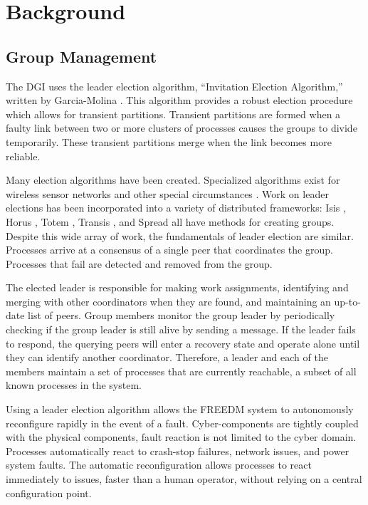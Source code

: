 \section{Background}

\subsection{Group Management}

The DGI uses the leader election algorithm, ``Invitation Election Algorithm,'' written by Garcia-Molina \cite{INVITATIONELECTION}.
This algorithm provides a robust election procedure which allows for transient partitions.
Transient partitions are formed when a faulty link between two or more clusters of processes causes the groups to divide temporarily.
These transient partitions merge when the link becomes more reliable.

Many election algorithms have been created.
Specialized algorithms exist for wireless sensor networks \cite{LE-WSN-1}\cite{LE-WSN-2} and other special circumstances \cite{LE-SPECIALCIRCUMSTANCES-1}\cite{LE-SPECIALCIRCUMSTANCES-2}.
Work on leader elections has been incorporated into a variety of distributed frameworks: Isis \cite{ISISTOOLKIT}, Horus \cite{HORUSTOOLKIT}, Totem \cite{TOTEMTOOLKIT}, Transis \cite{TRANSISTOOLKIT}, and Spread \cite{SPREADTOOLKIT} all have methods for creating groups.
Despite this wide array of work, the fundamentals of leader election are similar.
Processes arrive at a consensus of a single peer that coordinates the group.
Processes that fail are detected and removed from the group.

The elected leader is responsible for making work assignments, identifying and merging with other coordinators when they are found, and maintaining an up-to-date list of peers.
Group members monitor the group leader by periodically checking if the group leader is still alive by sending a message.
If the leader fails to respond, the querying peers will enter a recovery state and operate alone until they can identify another coordinator.
Therefore, a leader and each of the members maintain a set of processes that are currently reachable, a subset of all known processes in the system.

Using a leader election algorithm allows the FREEDM system to autonomously reconfigure rapidly in the event of a fault.
Cyber-components are tightly coupled with the physical components, fault reaction is not limited to the cyber domain.
Processes automatically react to crash-stop failures, network issues, and power system faults.
The automatic reconfiguration allows processes to react immediately to issues, faster than a human operator, without relying on a central configuration point.

